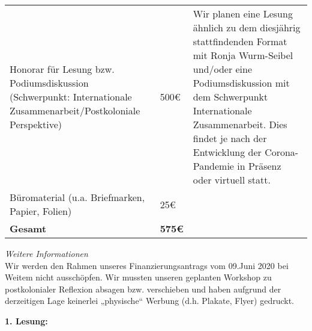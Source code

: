 {\begin{tabular}{p{4cm} p{2cm} p{9cm}}
        Honorar für Lesung bzw. Podiumsdiskussion \newline (Schwerpunkt: Internationale Zusammenarbeit/Postkoloniale Perspektive) & 500€ & Wir planen eine Lesung ähnlich zu dem diesjährig stattfindenden Format mit Ronja Wurm-Seibel und/oder eine Podiumsdiskussion mit dem Schwerpunkt Internationale Zusammenarbeit. Dies findet je nach der Entwicklung der Corona-Pandemie in Präsenz oder virtuell statt.\\
        Büromaterial (u.a. Briefmarken, Papier, Folien) & 25€ & \\
        \textbf{Gesamt} & \textbf{575€} & \\      
    \end{tabular}
    \newline
    \emph{Weitere Informationen}\\
    Wir werden den Rahmen unseres Finanzierungsantrags vom 09.Juni 2020 bei Weitem nicht ausschöpfen. Wir mussten unseren geplanten Workshop zu postkolonialer Reflexion absagen bzw. verschieben und haben aufgrund der derzeitigen Lage keinerlei „physische“ Werbung (d.h. Plakate, Flyer) gedruckt.
}{
    \textbf{1. Lesung:}
    \ul{}
}
